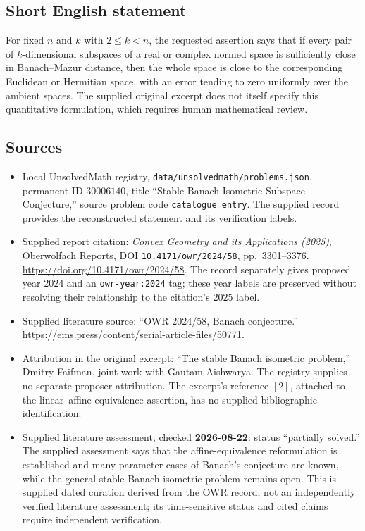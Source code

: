 \documentclass[11pt]{article}
\begin{document}
\subsection{Short English statement}
For fixed \(n\) and \(k\) with \(2\leq k<n\), the requested assertion says that if every pair of \(k\)-dimensional subspaces of a real or complex normed space is sufficiently close in Banach--Mazur distance, then the whole space is close to the corresponding Euclidean or Hermitian space, with an error tending to zero uniformly over the ambient spaces. The supplied original excerpt does not itself specify this quantitative formulation, which requires human mathematical review.
\subsection{Sources}
\begin{itemize}
\item Local UnsolvedMath registry, \texttt{data/unsolvedmath/problems.json}, permanent ID \(30006140\), title ``Stable Banach Isometric Subspace Conjecture,'' source problem code \texttt{catalogue entry}. The supplied record provides the reconstructed statement and its verification labels.
\item Supplied report citation: \emph{Convex Geometry and its Applications (2025)}, Oberwolfach Reports, DOI \texttt{10.4171/owr/2024/58}, pp.~3301--3376. \url{https://doi.org/10.4171/owr/2024/58}. The record separately gives proposed year \(2024\) and an \texttt{owr-year:2024} tag; these year labels are preserved without resolving their relationship to the citation's \(2025\) label.
\item Supplied literature source: ``OWR 2024/58, Banach conjecture.'' \url{https://ems.press/content/serial-article-files/50771}.
\item Attribution in the original excerpt: ``The stable Banach isometric problem,'' Dmitry Faifman, joint work with Gautam Aishwarya. The registry supplies no separate proposer attribution. The excerpt's reference \([2]\), attached to the linear--affine equivalence assertion, has no supplied bibliographic identification.
\item Supplied literature assessment, checked \textbf{2026-08-22}: status ``partially solved.'' The supplied assessment says that the affine-equivalence reformulation is established and many parameter cases of Banach's conjecture are known, while the general stable Banach isometric problem remains open. This is supplied dated curation derived from the OWR record, not an independently verified literature assessment; its time-sensitive status and cited claims require independent verification.
\end{itemize}
\end{document}
